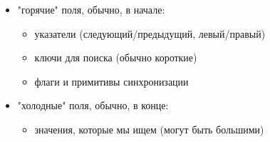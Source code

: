 \begin{frame}
\begin{columns}[T]
  \begin{column}{.7\textwidth}
    \begin{itemize}
      \item "горячие" поля, обычно, в начале:
        \begin{itemize}
          \item указатели (следующий/предыдущий, левый/правый)
          \item ключи для поиска (обычно короткие)
          \item флаги и примитивы синхронизации
        \end{itemize}
      \item "холодные" поля, обычно, в конце:
        \begin{itemize}
          \item значения, которые мы ищем (могут быть большими)
        \end{itemize}
    \end{itemize}
  \end{column}

\end{columns}

\end{frame}

